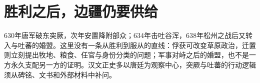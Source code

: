 \section{胜利之后，边疆仍要供给} \label{sec:tang-frontiers-silk-road}  630年唐军破东突厥，次年安置降附部众；634年击吐谷浑，638年松州之战后又转入与吐蕃的婚盟。这里没有一条从胜利到服从的直线：俘获可改变草原政治，迁置则立刻提出牧地、粮食、任官与身份分类的问题；军事对峙之后的婚盟，也不是一方永久支配另一方的证明。汉文正史多以唐廷为观察中心，突厥与吐蕃的行动逻辑须从碑铭、文书和外部材料中补问。%